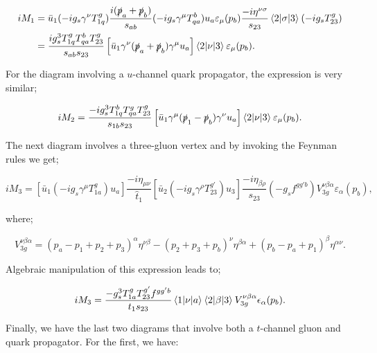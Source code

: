 \begin{equation}
\begin{split}
iM_1 &= \bar{u}_1(-ig_s\gamma^\nu T^g_{1q})\frac{i(\slashed{p}_a+\slashed{p}_b)}{s_{ab}}(-ig_s \gamma^\mu T_{qa}^b)u_a \varepsilon_\mu(p_b) \frac{-i \eta^{\nu \sigma}}{s_{23}} \mathinner{\langle2\vert\sigma\vert3\rangle}_{} (- i g_s T^g_{23}) \\
&= \frac{i g_s^3 T^g_{1q}T^b_{qa}T^g_{23}}{s_{ab}s_{23}} \left[ \bar{u}_1 \gamma^\nu (\slashed{p}_a + \slashed{p}_b) \gamma^\mu u_a \right] \mathinner{\langle2\vert\nu\vert3\rangle}_{} \varepsilon_\mu (p_b).
\end{split}
\end{equation}

For the diagram involving a $u$-channel quark propagator, the expression is very similar;

\begin{equation}
iM_2 = \frac{-i g_s^3 T^b_{1q}T^g_{qa}T^g_{23}}{s_{1b}s_{23}} \left[ \bar{u}_1 \gamma^\mu (\slashed{p}_1 - \slashed{p}_b) \gamma^\nu u_a \right] \mathinner{\langle2\vert\nu\vert3\rangle}_{} \varepsilon_\mu (p_b).
\end{equation}

The next diagram involves a three-gluon vertex and by invoking the Feynman rules we get;

\begin{equation}
iM_3 = \left[\bar{u}_1(-i g_s \gamma^\mu T^g_{1a}) u_a \right] \frac{-i \eta_{\mu \nu}}{\hat{t}_1} \left[\bar{u}_2 (-i g_s \gamma^\rho T^{g'}_{23}) u_3 \right] \frac{- i \eta_{\beta \rho}}{s_{23}} (-g_s f^{g g' b})V_{3g}^{\nu  \beta \alpha} \varepsilon_\alpha(p_b),
\end{equation}

where;

\begin{equation}
V_{3g}^{\nu \beta \alpha} = (p_a - p_1 +p_2 + p_3)^\alpha \eta^{\nu \beta} - (p_2 + p_3 + p_b)^\nu \eta^{\beta \alpha} + (p_b -p_a + p_1)^\beta \eta^{ \alpha \nu}. 
\end{equation}

Algebraic manipulation of this expression leads to;

\begin{equation}
iM_3 = \frac{-g_s^3 T^g_{1a} T^{g'}_{23} f^{g g' b}}{t_1 s_{23}}  \mathinner{\langle1\vert\nu\vert a\rangle}_{} \mathinner{\langle2\vert\beta\vert3\rangle}_{} V_{3g}^{\nu \beta \alpha}\epsilon_\alpha(p_b).
\end{equation}

Finally, we have the last two diagrams that involve both a $t$-channel gluon and quark propagator. For the first, we have:

